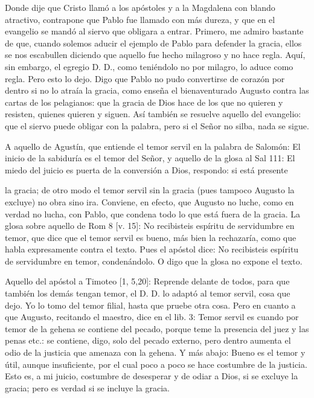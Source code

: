Donde dije que Cristo llamó a los apóstoles y a la Magdalena con blando atractivo, contrapone que Pablo fue llamado con más dureza, y que en el evangelio se mandó al siervo que obligara a entrar. Primero, me admiro bastante de que, cuando solemos aducir el ejemplo de Pablo para defender la gracia, ellos se nos escabullen diciendo que aquello fue hecho milagroso y no hace regla. Aquí, sin embargo, el egregio D. D., como teniéndolo no por milagro, lo aduce como regla. Pero esto lo dejo. Digo que Pablo no pudo convertirse de corazón por dentro si no lo atraía la gracia, como enseña el bienaventurado Augusto contra las cartas de los pelagianos: que la gracia de Dios hace de los que no quieren y resisten, quienes quieren y siguen. Así también se resuelve aquello del evangelio: que el siervo puede obligar con la palabra, pero si el Señor no silba, nada se sigue.

A aquello de Agustín, que entiende el temor servil en la palabra de Salomón: El inicio de la sabiduría es el temor del Señor, y aquello de la glosa al Sal 111: El miedo del juicio es puerta de la conversión a Dios, respondo: si está presente

la gracia; de otro modo el temor servil sin la gracia (pues tampoco Augusto la excluye) no obra sino ira. Conviene, en efecto, que Augusto no luche, como en verdad no lucha, con Pablo, que condena todo lo que está fuera de la gracia. La glosa sobre aquello de Rom 8 [v. 15]: No recibisteis espíritu de servidumbre en temor, que dice que el temor servil es bueno, más bien la rechazaría, como que habla expresamente contra el texto. Pues el apóstol dice: No recibisteis espíritu de servidumbre en temor, condenándolo. O digo que la glosa no expone el texto.

Aquello del apóstol a Timoteo [1, 5,20]: Reprende delante de todos, para que también los demás tengan temor, el D. D. lo adaptó al temor servil, cosa que dejo. Yo lo tomo del temor filial, hasta que pruebe otra cosa. Pero en cuanto a que Augusto, recitando el maestro, dice en el lib. 3: Temor servil es cuando por temor de la gehena se contiene del pecado, porque teme la presencia del juez y las penas etc.: se contiene, digo, solo del pecado externo, pero dentro aumenta el odio de la justicia que amenaza con la gehena. Y más abajo: Bueno es el temor y útil, aunque insuficiente, por el cual poco a poco se hace costumbre de la justicia. Esto es, a mi juicio, costumbre de desesperar y de odiar a Dios, si se excluye la gracia; pero es verdad si se incluye la gracia.

